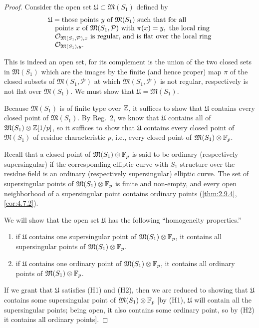 \begin{proof}
Consider the open set $\mathfrak{U} \subset \mathfrak{M}(S_1)$ defined by
\[
\begin{array}{@{}l@{}}
\mathfrak{U} = \text{those points } y \text{ of } \mathfrak{M}(S_1) \text{ such that for all} \\
\quad\text{points } x \text{ of } \mathfrak{M}(S_1, \mathcal{P}) \text{ with } \pi(x) = y, \text{ the local ring} \\
\quad\cO_{\mathfrak{M}(S_1, \mathcal{P}), x} \text{ is regular, and is flat over the local ring} \\
\quad\cO_{\mathfrak{M}(S_1), y}.
\end{array}
\]

This is indeed an open set, for its complement is the union of the two closed sets in $\mathfrak{M}(S_1)$ which are the images by the finite (and hence proper) map $\pi$ of the closed subsets of $\mathfrak{M}(S_1, \mathcal{P})$ at which $\mathfrak{M}(S_1, \mathcal{P})$ is not regular, respectively is not flat over $\mathfrak{M}(S_1)$. We must show that $\mathfrak{U} = \mathfrak{M}(S_1)$.

Because $\mathfrak{M}(S_1)$ is of finite type over $\mathbb{Z}$, it suffices to show that $\mathfrak{U}$ contains every closed point of $\mathfrak{M}(S_1)$. By Reg.~2, we know that $\mathfrak{U}$ contains all of $\mathfrak{M}(S_1)\otimes\mathbb{Z}[1/p]$, so it suffices to show that $\mathfrak{U}$ contains every closed point of $\mathfrak{M}(S_1)$ of residue characteristic $p$, i.e., every closed point of $\mathfrak{M}(S_1)\otimes\mathbb{F}_p$.

Recall that a closed point of $\mathfrak{M}(S_1)\otimes\mathbb{F}_p$ is said to be ordinary (respectively supersingular) if the corresponding elliptic curve with $S_1$-structure over the residue field is an ordinary (respectively supersingular) elliptic curve. The set of supersingular points of $\mathfrak{M}(S_1)\otimes\mathbb{F}_p$ is finite and non-empty, and every open neighborhood of a supersingular point contains ordinary points (\ref{thm:2.9.4}, \ref{cor:4.7.2}).

We will show that the open set $\mathfrak{U}$ has the following ``homogeneity properties.''
\begin{enumerate}[label=(H\arabic*)]
\item if $\mathfrak{U}$ contains one supersingular point of $\mathfrak{M}(S_1)\otimes\mathbb{F}_p$, it contains all supersingular points of $\mathfrak{M}(S_1)\otimes\mathbb{F}_p$.
\item if $\mathfrak{U}$ contains one ordinary point of $\mathfrak{M}(S_1)\otimes\mathbb{F}_p$, it contains all ordinary points of $\mathfrak{M}(S_1)\otimes\mathbb{F}_p$.
\end{enumerate}
If we grant that $\mathfrak{U}$ satisfies (H1) and (H2), then we are reduced to showing that $\mathfrak{U}$ contains some supersingular point of $\mathfrak{M}(S_1)\otimes\mathbb{F}_p$ [by (H1), $\mathfrak{U}$ will contain all the supersingular points; being open, it also contains some ordinary point, so by (H2) it contains all ordinary points].


\end{proof}
